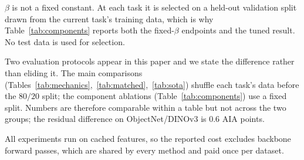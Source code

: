 $\beta$ is not a fixed constant. At each task it is selected on a held-out validation split drawn from the current task's training data, which is why Table~\ref{tab:components} reports both the fixed-$\beta$ endpoints and the tuned result. No test data is used for selection.

Two evaluation protocols appear in this paper and we state the difference rather than eliding it. The main comparisons (Tables~\ref{tab:mechanics},~\ref{tab:matched},~\ref{tab:sota}) shuffle each task's data before the $80/20$ split; the component ablations (Table~\ref{tab:components}) use a fixed split. Numbers are therefore comparable within a table but not across the two groups; the residual difference on ObjectNet/DINOv3 is $0.6$ AIA points.

All experiments run on cached features, so the reported cost excludes backbone forward passes, which are shared by every method and paid once per dataset.
